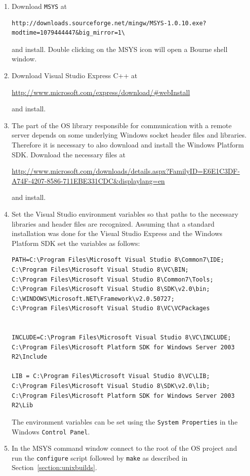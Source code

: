 \documentclass[11pt]{article}
\renewcommand{\_}{{\char"5F}}
\renewcommand{\{}{{\char"7B}}
\renewcommand{\}}{{\char"7D}}
\renewcommand{\^}{{\char"0D}}
\renewcommand{\'}{{\char"0D}}
\begin{document}
\begin{enumerate}[Step 1.]

\item{} Download {\tt MSYS} at

{\small
\begin{verbatim}
http://downloads.sourceforge.net/mingw/MSYS-1.0.10.exe?modtime=1079444447&big_mirror=1\
\end{verbatim}
}

and install.  Double clicking on the MSYS icon will open a Bourne shell window.

\item{}  Download  Visual Studio Express C++ at

 \url{http://www.microsoft.com/express/download/#webInstall}

and install.

 \item{}  The part of the OS library responsible for communication with a remote server depends on some underlying 
Windows socket header files and libraries. Therefore it is necessary to also download and install 
the Windows Platform SDK\index{Windows Platform SDK}. Download the necessary files at

 \url{http://www.microsoft.com/downloads/details.aspx?FamilyID=E6E1C3DF-A74F-4207-8586-711EBE331CDC&displaylang=en}

 and install.

\item{}   Set the Visual Studio environment variables so that paths to the necessary libraries and header files  are recognized.  Assuming that a standard installation was done for the Visual Studio Express and the Windows Platform SDK set the variables as follows:

\begin{verbatim}
PATH=C:\Program Files\Microsoft Visual Studio 8\Common7\IDE;
C:\Program Files\Microsoft Visual Studio 8\VC\BIN;
C:\Program Files\Microsoft Visual Studio 8\Common7\Tools;
C:\Program Files\Microsoft Visual Studio 8\SDK\v2.0\bin;
C:\WINDOWS\Microsoft.NET\Framework\v2.0.50727;
C:\Program Files\Microsoft Visual Studio 8\VC\VCPackages


INCLUDE=C:\Program Files\Microsoft Visual Studio 8\VC\INCLUDE;
C:\Program Files\Microsoft Platform SDK for Windows Server 2003 R2\Include

LIB = C:\Program Files\Microsoft Visual Studio 8\VC\LIB;
C:\Program Files\Microsoft Visual Studio 8\SDK\v2.0\lib;
C:\Program Files\Microsoft Platform SDK for Windows Server 2003 R2\Lib
\end{verbatim}

The environment variables can be set using the {\tt System Properties} in the Windows {\tt Control Panel}.


\item{}  In the MSYS command window connect to the root of the OS project and run the {\tt configure}  script  followed by {\tt make} as described in Section~\ref{section:unixbuilds}.

\end{enumerate}
\end{document}
